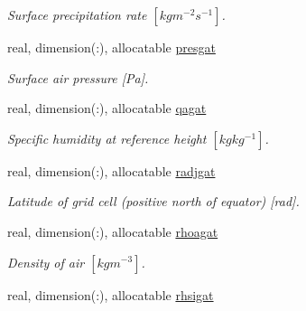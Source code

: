 \begin{DoxyCompactItemize}
\begin{DoxyCompactList}\small\item\em Surface precipitation rate $[kg m^{-2} s^{-1} ]$. \end{DoxyCompactList}\item 
\hypertarget{structclass__statevars_1_1class__gather_a2e3e457c1c99ae64ec94e176d6573e28}{}real, dimension(\+:), allocatable \hyperlink{structclass__statevars_1_1class__gather_a2e3e457c1c99ae64ec94e176d6573e28}{presgat}\label{structclass__statevars_1_1class__gather_a2e3e457c1c99ae64ec94e176d6573e28}

\begin{DoxyCompactList}\small\item\em Surface air pressure \mbox{[}Pa\mbox{]}. \end{DoxyCompactList}\item 
\hypertarget{structclass__statevars_1_1class__gather_aec85dbcc4575b59780df38daac5bb326}{}real, dimension(\+:), allocatable \hyperlink{structclass__statevars_1_1class__gather_aec85dbcc4575b59780df38daac5bb326}{qagat}\label{structclass__statevars_1_1class__gather_aec85dbcc4575b59780df38daac5bb326}

\begin{DoxyCompactList}\small\item\em Specific humidity at reference height $[kg kg^{-1} ]$. \end{DoxyCompactList}\item 
\hypertarget{structclass__statevars_1_1class__gather_ad0c5d49599e2221e925f46ab8cf3237d}{}real, dimension(\+:), allocatable \hyperlink{structclass__statevars_1_1class__gather_ad0c5d49599e2221e925f46ab8cf3237d}{radjgat}\label{structclass__statevars_1_1class__gather_ad0c5d49599e2221e925f46ab8cf3237d}

\begin{DoxyCompactList}\small\item\em Latitude of grid cell (positive north of equator) \mbox{[}rad\mbox{]}. \end{DoxyCompactList}\item 
\hypertarget{structclass__statevars_1_1class__gather_ac8e2ebe19b5cab20152df9a831ec8466}{}real, dimension(\+:), allocatable \hyperlink{structclass__statevars_1_1class__gather_ac8e2ebe19b5cab20152df9a831ec8466}{rhoagat}\label{structclass__statevars_1_1class__gather_ac8e2ebe19b5cab20152df9a831ec8466}

\begin{DoxyCompactList}\small\item\em Density of air $[kg m^{-3} ]$. \end{DoxyCompactList}\item 
\hypertarget{structclass__statevars_1_1class__gather_af955a6920be7ec340d2e50c8743713f3}{}real, dimension(\+:), allocatable \hyperlink{structclass__statevars_1_1class__gather_af955a6920be7ec340d2e50c8743713f3}{rhsigat}\label{structclass__statevars_1_1class__gather_af955a6920be7ec340d2e50c8743713f3}


\end{DoxyCompactItemize}
